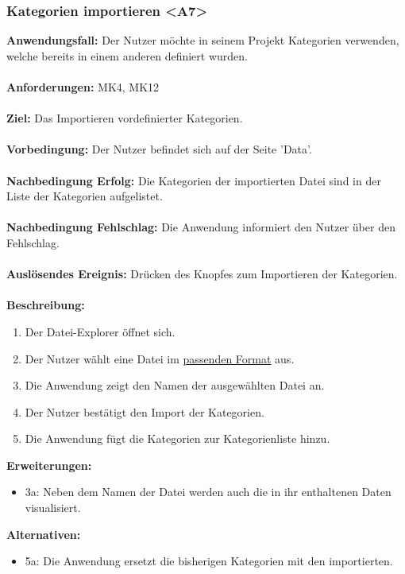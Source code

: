 \documentclass[parskip=full]{scrartcl} %
\begin{document}
\subsubsection*{Kategorien importieren <A7>}
\textbf{Anwendungsfall:} Der Nutzer möchte in seinem Projekt Kategorien verwenden, welche bereits in einem anderen definiert wurden.\\\\
\textbf{Anforderungen:} MK4, MK12\\\\
\textbf{Ziel:} Das Importieren vordefinierter Kategorien. \\\\
\textbf{Vorbedingung:} Der Nutzer befindet sich auf der Seite 'Data'. \\\\
\textbf{Nachbedingung Erfolg:} Die Kategorien der importierten Datei sind in der Liste der Kategorien aufgelistet. \\\\
\textbf{Nachbedingung Fehlschlag:} Die Anwendung informiert den Nutzer über den Fehlschlag. \\\\
\textbf{Auslösendes Ereignis:} Drücken des Knopfes zum Importieren der Kategorien.\\\\
\textbf{Beschreibung:}
\begin{enumerate}
    \item Der Datei-Explorer öffnet sich.
    \item Der Nutzer wählt eine Datei im \hyperlink{dataformat}{passenden Format} aus.
    \item Die Anwendung zeigt den Namen der ausgewählten Datei an.
    \item Der Nutzer bestätigt den Import der Kategorien.
    \item Die Anwendung fügt die Kategorien zur Kategorienliste hinzu.
\end{enumerate}
\textbf{Erweiterungen:} 
\begin{itemize}
    \item 3a: Neben dem Namen der Datei werden auch die in ihr enthaltenen Daten visualisiert.
\end{itemize}
\textbf{Alternativen:} 
\begin{itemize}
    \item 5a: Die Anwendung ersetzt die bisherigen Kategorien mit den importierten.
\end{itemize}
\newpage
\end{document}
